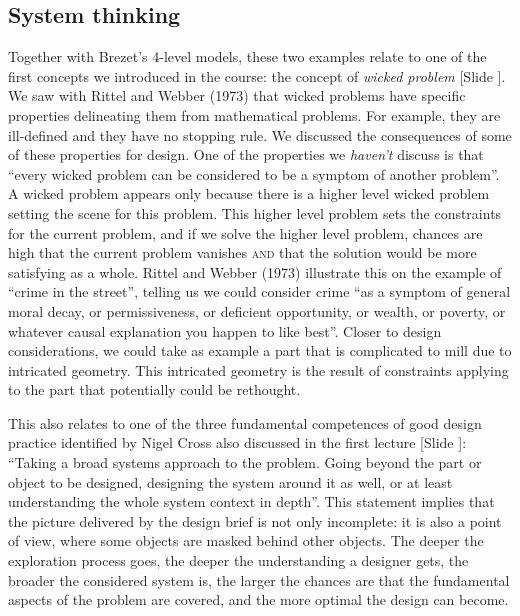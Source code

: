 \documentclass{article}
\newcounter{slide}
\begin{document}
\subsection{System thinking}
\label{sec:systemthinking}

Together with Brezet's 4-level models, these two examples relate to one of the first concepts we introduced in the course: the concept of \emph{wicked problem} {\color{blue}[Slide ]}. We saw with Rittel and Webber (1973)\cite{rittelDilemmasGeneralTheory1973} that wicked problems have specific properties delineating them from mathematical problems. For example, they are ill-defined and they have no stopping rule. We discussed the consequences of some of these properties for design. One of the properties we \emph{haven't} discuss is that ``every wicked problem can be considered to be a symptom of another problem''\cite{rittelDilemmasGeneralTheory1973}. A wicked problem appears only because there is a higher level wicked problem setting the scene for this problem. This higher level problem sets the constraints for the current problem, and if we solve the higher level problem, chances are high that the current problem vanishes \textsc{and} that the solution would be more satisfying as a whole. Rittel and Webber (1973)\cite{rittelDilemmasGeneralTheory1973} illustrate this on the example of ``crime in the street'', telling us we could consider crime ``as a symptom of general moral decay, or permissiveness, or deficient opportunity, or wealth, or poverty, or whatever causal explanation you happen to
like best''. Closer to design considerations, we could take as example a part that is complicated to mill due to intricated geometry. This intricated geometry is the result of constraints applying to the part that potentially could be rethought. 

This also relates to one of the three fundamental competences of good design practice identified by Nigel Cross also discussed in the first lecture {\color{blue}[Slide ]}\cite[reformulated by Elies Dekonkinck]{crossDesignThinkingUnderstanding2011}: ``Taking a broad systems approach to the problem. Going beyond the part or object to be designed, designing the system around it as well, or at least understanding the whole system context in depth''. This statement implies that the picture delivered by the design brief is not only incomplete: it is also a point of view, where some objects are masked behind other objects. The deeper the exploration process goes, the deeper the understanding a designer gets, the broader the considered system is, the larger the chances are that the fundamental aspects of the problem are covered, and the more optimal the design can become.  
\end{document}
